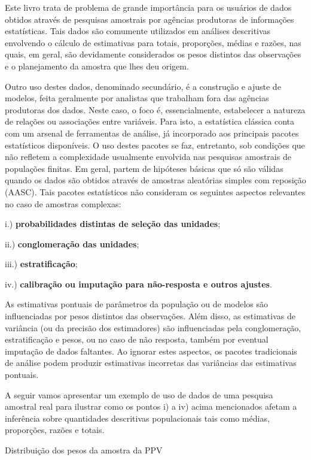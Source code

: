 \documentclass[]{book}
\theoremstyle{definition}
\theoremstyle{definition}
\theoremstyle{definition}
\theoremstyle{remark}
\let\BeginKnitrBlock\begin \let\EndKnitrBlock\end
\begin{document}
Este livro trata de problema de grande importância para os usuários de
dados obtidos através de pesquisas amostrais por agências produtoras de
informações estatísticas. Tais dados são comumente utilizados em
análises descritivas envolvendo o cálculo de estimativas para totais,
proporções, médias e razões, nas quais, em geral, são devidamente
considerados os pesos distintos das observações e o planejamento da
amostra que lhes deu origem.

Outro uso destes dados, denominado secundário, é a construção e ajuste
de modelos, feita geralmente por analistas que trabalham fora das
agências produtoras dos dados. Neste caso, o foco é, essencialmente,
estabelecer a natureza de relações ou associações entre variáveis. Para
isto, a estatística clássica conta com um arsenal de ferramentas de
análise, já incorporado aos principais pacotes estatísticos disponíveis.
O uso destes pacotes se faz, entretanto, sob condições que não refletem
a complexidade usualmente envolvida nas pesquisas amostrais de
populações finitas. Em geral, partem de hipóteses básicas que só são
válidas quando os dados são obtidos através de amostras aleatórias
simples com reposição (AASC). Tais pacotes estatísticos não consideram
os seguintes aspectos relevantes no caso de amostras complexas:

i.) \textbf{probabilidades distintas de seleção das unidades};

ii.) \textbf{conglomeração das unidades};

iii.) \textbf{estratificação};

iv.) \textbf{calibração ou imputação para não-resposta e outros
ajustes}.

As estimativas pontuais de parâmetros da população ou de modelos são
influenciadas por pesos distintos das observações. Além disso, as
estimativas de variância (ou da precisão dos estimadores) são
influenciadas pela conglomeração, estratificação e pesos, ou no caso de
não resposta, também por eventual imputação de dados faltantes. Ao
ignorar estes aspectos, os pacotes tradicionais de análise podem
produzir estimativas incorretas das variâncias das estimativas pontuais.

A seguir vamos apresentar um exemplo de uso de dados de uma pesquisa
amostral real para ilustrar como os pontos i) a iv) acima mencionados
afetam a inferência sobre quantidades descritivas populacionais tais
como médias, proporções, razões e totais.

\BeginKnitrBlock{example}
\protect\hypertarget{exm:distppv}{}{\label{exm:distppv} }Distribuição dos
pesos da amostra da PPV
\EndKnitrBlock{example}
\end{document}
